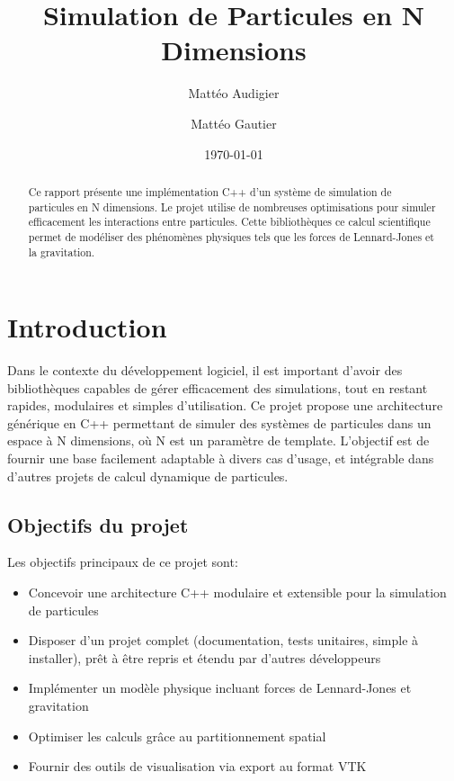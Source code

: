 \documentclass[12pt,a4paper]{article}
\title{Simulation de Particules en N Dimensions}
\author{Mattéo Audigier \and Mattéo Gautier}
\date{\today}
\begin{document}
\maketitle

\begin{abstract}
Ce rapport présente une implémentation C++ d'un système de simulation de particules en N dimensions. Le projet utilise de nombreuses optimisations pour simuler efficacement les interactions entre particules. Cette bibliothèques ce calcul scientifique permet de modéliser des phénomènes physiques tels que les forces de Lennard-Jones et la gravitation.
\end{abstract}

\newpage

\tableofcontents

\newpage

\section{Introduction}

Dans le contexte du développement logiciel, il est important d'avoir des bibliothèques capables de gérer efficacement des simulations, tout en restant rapides, modulaires et simples d'utilisation. Ce projet propose une architecture générique en C++ permettant de simuler des systèmes de particules dans un espace à N dimensions, où N est un paramètre de template. L'objectif est de fournir une base facilement adaptable à divers cas d'usage, et intégrable dans d'autres projets de calcul dynamique de particules.

\subsection{Objectifs du projet}

Les objectifs principaux de ce projet sont:
\begin{itemize}
    \item Concevoir une architecture C++ modulaire et extensible pour la simulation de particules
    \item Disposer d'un projet complet (documentation, tests unitaires, simple à installer), prêt à être repris et étendu par d'autres développeurs
    \item Implémenter un modèle physique incluant forces de Lennard-Jones et gravitation
    \item Optimiser les calculs grâce au partitionnement spatial
    \item Fournir des outils de visualisation via export au format VTK
\end{itemize}
\end{document}
